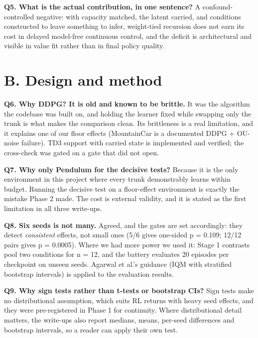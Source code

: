 \documentclass[11pt]{article}
\begin{document}
\textbf{Q5. What is the actual contribution, in one sentence?} A confound-controlled negative: with capacity matched, the latent carried, and conditions constructed to leave something to infer, weight-tied recursion does not earn its cost in delayed model-free continuous control, and the deficit is architectural and visible in value fit rather than in final policy quality.



\section*{B. Design and method}



\textbf{Q6. Why DDPG? It is old and known to be brittle.} It was the algorithm the codebase was built on, and holding the learner fixed while swapping only the trunk is what makes the comparison clean. Its brittleness is a real limitation, and it explains one of our floor effects (MountainCar is a documented DDPG + OU-noise failure). TD3 support with carried state is implemented and verified; the cross-check was gated on a gate that did not open.



\textbf{Q7. Why only Pendulum for the decisive tests?} Because it is the only environment in this project where every trunk demonstrably learns within budget. Running the decisive test on a floor-effect environment is exactly the mistake Phase 2 made. The cost is external validity, and it is stated as the first limitation in all three write-ups.



\textbf{Q8. Six seeds is not many.} Agreed, and the gates are set accordingly: they detect \emph{consistent} effects, not small ones (5/6 gives one-sided p = 0.109; 12/12 pairs gives p = 0.0005). Where we had more power we used it: Stage 1 contrasts pool two conditions for n = 12, and the battery evaluates 20 episodes per checkpoint on unseen seeds. Agarwal et al.'s guidance (IQM with stratified bootstrap intervals) is applied to the evaluation results.



\textbf{Q9. Why sign tests rather than t-tests or bootstrap CIs?} Sign tests make no distributional assumption, which suits RL returns with heavy seed effects, and they were pre-registered in Phase 1 for continuity. Where distributional detail matters, the write-ups also report medians, means, per-seed differences and bootstrap intervals, so a reader can apply their own test.
\end{document}
